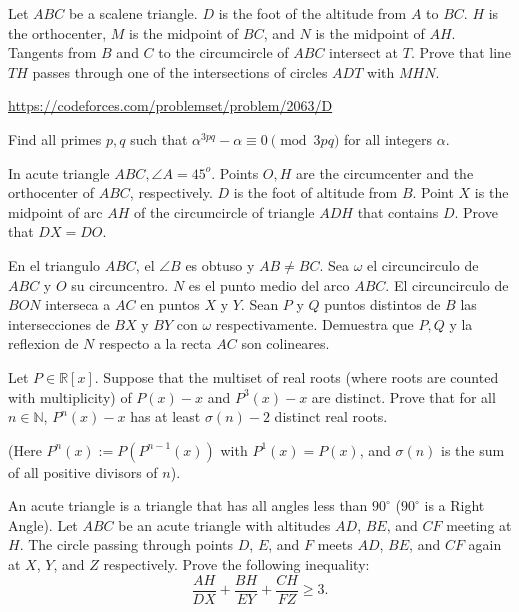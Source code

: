 \documentclass[11pt]{scrartcl}
\begin{document}
\begin{problem}[GMO 2024/3]
	Let $ABC$ be a scalene triangle. $D$ is the foot of the altitude from $A$ to $BC$. $H$ is the orthocenter, $M$ is the midpoint of $BC$, and $N$ is the midpoint of $AH$. Tangents from $B$ and $C$ to the circumcircle of $ABC$ intersect at $T$. Prove that line $TH$ passes through one of the intersections of circles $ADT$ with $MHN$.
\end{problem}
\begin{problem}[CF 2063D]
\url{https://codeforces.com/problemset/problem/2063/D}
\end{problem}
\begin{problem}
Find all primes $ p,q $ such that $ \alpha^{3pq} -\alpha \equiv 0 \pmod {3pq} $ for all integers $ \alpha $.
\end{problem}
\begin{problem}
	In acute triangle $ABC, \angle A = 45^o$. Points $O,H$ are the circumcenter and the orthocenter of $ABC$, respectively. $D$ is the foot of altitude from $B$. Point $X$ is the midpoint of arc $AH$ of the circumcircle of triangle $ADH$ that contains $D$. Prove that $DX = DO$.
\end{problem}
\begin{problem}
En el triangulo $ABC$, el $\angle B$ es obtuso y $AB \neq BC$. Sea $\omega$ el circuncirculo de $ABC$ y $O$ su circuncentro. $N$ es el punto medio del arco $ABC$. El circuncirculo de $BON$ interseca a $AC$ en puntos $X$ y $Y$. Sean $P$ y $Q$ puntos distintos de $B$ las intersecciones de $BX$ y $BY$ con $\omega$ respectivamente. Demuestra que $P,Q$ y la reflexion de $N$ respecto a la recta $AC$ son colineares.  
\end{problem}
\begin{problem}
Let $P \in \mathbb{R}[x]$. Suppose that the multiset of real roots (where roots are counted with multiplicity) of $P(x)-x$ and $P^3(x)-x$ are distinct. Prove that for all $n\in \mathbb{N}$, $P^n(x)-x$ has at least $\sigma(n)-2$ distinct real roots.

(Here $P^n(x):=P(P^{n-1}(x))$ with $P^1(x) = P(x)$, and $\sigma(n)$ is the sum of all positive divisors of $n$).
\end{problem}
\begin{problem}[Canada 2023/3]
    An acute triangle is a triangle that has all angles less than $90^{\circ}$ ($90^{\circ}$ is a Right Angle). Let $ABC$ be an acute triangle with altitudes $AD$, $BE$, and $CF$ meeting at $H$. The circle passing through points $D$, $E$, and $F$ meets $AD$, $BE$, and $CF$ again at $X$, $Y$, and $Z$ respectively. Prove the following inequality:$$\frac{AH}{DX}+\frac{BH}{EY}+\frac{CH}{FZ} \geq 3.$$
\end{problem}
\end{document}
